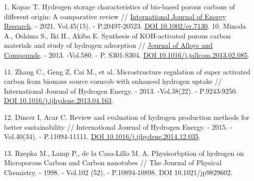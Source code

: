 \begin{references}
1. Kopac T. Hydrogen storage characteristics of bio-based porous carbons
of different origin: A comparative review //
\href{https://onlinelibrary.wiley.com/journal/1099114x}{International
Journal of Energy Research}. - 2021. Vol.45(15). - P.20497-20523.
\href{https://doi.org/10.1002/er.7130}{DOI 10.1002/er.7130}.
10. Minoda A., Oshima S., Iki H., Akiba E. Synthesis of KOH-activated
porous carbon materials and study of hydrogen adsorption //
\href{https://www.researchgate.net/journal/Journal-of-Alloys-and-Compounds-0925-8388?_tp=eyJjb250ZXh0Ijp7ImZpcnN0UGFnZSI6InB1YmxpY2F0aW9uIiwicGFnZSI6InB1YmxpY2F0aW9uIn19}{Journal
of Alloys and Compounds}. - 2013. -Vol.580. - P. S301-S304.
\href{https://doi.org/10.1016/j.jallcom.2013.02.085}{DOI
10.1016/j.jallcom.2013.02.085}.

11. Zhang C., Geng Z, Cai M., et al. Microstructure regulation of super
activated carbon from biomass source corncob with enhanced hydrogen
uptake // International Journal of Hydrogen Energy. - 2013. -Vol.38(22).
- P.9243-9250.
\href{https://doi.org/10.1016/j.ijhydene.2013.04.163}{DOI
10.1016/j.ijhydene.2013.04.163}.

12. Dincer I, Acar C. Review and evaluation of hydrogen production
methods for better sustainability // International Journal of Hydrogen
Energy. - 2015. -Vol.40(34). - P.11094-11111.
\href{https://doi.org/10.1016/j.ijhydene.2014.12.035}{DOI
10.1016/j.ijhydene.2014.12.035}.

13. Rzepka M., Lamp P., de la Casa-Lillo M. A. Physisorbption of hydrogen
on Microporous Carbon and Carbon nanotubes // The Journal of Physical
Chemistry. - 1998. - Vol.102 (52). - P.10894-10898. DOI
10.1021/jp9829602.
\end{references}

